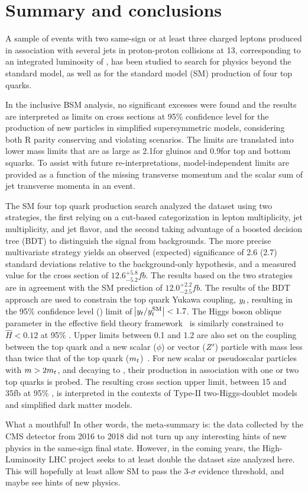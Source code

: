 \chapter{Summary and conclusions}

A sample of events with two same-sign or at least three charged leptons
produced in association with several jets in proton-proton collisions at
13\TeV, corresponding to an integrated luminosity of \sslumi, has been
studied to search for physics beyond the standard model, as well as for the
standard model (SM) production of four top quarks.

In the inclusive BSM analysis, no significant excesses were found and the
results are interpreted as limits on cross sections at 95\% confidence level
for the production of new particles in simplified supersymmetric models,
considering both R parity conserving and violating scenarios. The limits
are translated into lower mass limits that are as large as 2.1\TeV for
gluinos and 0.9\TeV for top and bottom squarks. 
To assist with future re-interpretations, model-independent limits are
provided as a function of the missing transverse momentum and the scalar sum
of jet transverse momenta in an event.

The SM four top quark production search analyzed the dataset using two
strategies, the first relying on a cut-based categorization in lepton
multiplicity, jet multiplicity, and jet flavor, and the second taking
advantage of a boosted decision tree (BDT) to distinguish the \tttt signal
from backgrounds. The more precise multivariate strategy yields an observed
(expected) significance of 2.6 (2.7) standard deviations relative to the
background-only hypothesis, and a measured value for the \tttt cross section
of $12.6^{+5.8}_{-5.2}\unit{fb}$. The results based on the two strategies are
in agreement with the SM prediction of $12.0^{+2.2}_{-2.5}\unit{fb}$. The
results of the BDT approach are used to constrain the top quark Yukawa
coupling, $y_{t}$, resulting in the 95\% confidence level (\CL) limit of
$\abs{y_{t}/y_{t}^{\mathrm{SM}}} < 1.7$. The Higgs boson oblique
parameter in the effective field theory
framework~\cite{THEORY:ObliqueHiggs2019} is similarly constrained to $\hat{H}
< 0.12$ at 95\% \CL. Upper limits between 0.1 and 1.2 are also set on the
coupling between the top quark and a new scalar ($\phi$) or vector ($Z^\prime$)
particle with mass less than twice that of the top quark
($m_t$)~\cite{THEORY:Alvarez2016nrz}. For new scalar or
pseudoscalar particles with $m > 2m_t$, and decaying to \ttbar,
their production in association with one or two top quarks is probed.
The resulting cross section upper limit, between 15 and
35\unit{fb} at 95\% \CL, is interpreted in the contexts of Type-II
two-Higgs-doublet models and simplified dark matter models.

What a mouthful! In other words, the meta-summary is: the data collected by
the CMS detector from 2016 to 2018 did not turn up any interesting hints of
new physics in the same-sign final state. However, in the coming years, the
High-Luminosity LHC project seeks to at least double the dataset size
analyzed here. This will hopefully at least allow SM \tttt to pass the
3-$\sigma$ evidence threshold, and maybe see hints of new physics.

